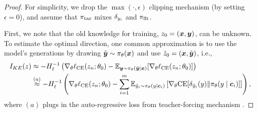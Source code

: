 \begin{proof}

For simplicity, we drop the $\max(\cdot, \epsilon)$ clipping mechanism (by setting $\epsilon = 0$), and assume that $\pi_\text{tar}$ mixes $\de{y_i}{}$ and $\pi_\text{flt}$. 

First, we note that the old knowledge for training, $z_0 = (\boldsymbol{x}, \boldsymbol{y})$, can be unknown. 
To estimate the optimal direction, one common approximation \citep{} is to use the model's generations by drawing $\tilde {\boldsymbol{y}} \sim \pi_\theta (\boldsymbol{x})$ and use $\Tilde{z}_0 = (\boldsymbol{x}, \tilde {\boldsymbol{y}})$, i.e., 
\begin{align}
I_{KE}(z) 
\notag &\approx
-H_\ell^{-1} 
\left(
\nabla_\theta \ell_{\ce} (z_n; \theta_0) - 
\E_{\yv \sim \pil(\tilde \yv \mid \xv)} [\nabla_\theta \ell_{\ce} (z_n; \theta_0)]
\right) \\
&\overset{(a)}{\approx} 
-H_\ell^{-1}
\left( 
\nabla_\theta \ell_{\ce} (z_n; \theta_0) - 
\sum_{i=1}^m \E_{\tilde y_i \sim \pil(y \mid \cv_i)}
\left[\nabla_\theta \ce [\de{\tilde y_i}{y} \| \pil(y \mid \cv_i)]\right]
\right),
\label{eq:opt-direct}
\end{align}
where $(a)$ plugs in the auto-regressive loss from teacher-forcing mechanism \citep{}. 


\end{proof}
